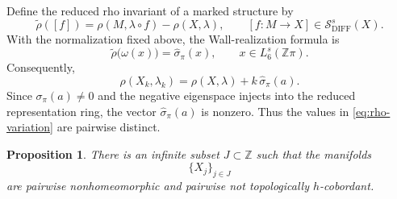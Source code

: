 \documentclass[10pt,reqno]{amsart}
\numberwithin{equation}{section}
\newtheorem{proposition}{Proposition}
\theoremstyle{definition}
\theoremstyle{remark}
\newcommand{\Z}{\mathbb Z}
\newcommand{\DIFF}{\mathrm{DIFF}}
\newcommand{\cS}{\mathcal S}
\newcommand{\rhot}{\widetilde{\rho}}
\begin{document}
Define the reduced rho invariant of a marked structure by
\[
\rhot([f])
=
\rho(M,\lambda\circ f)-\rho(X,\lambda),
\qquad
[f\colon M\to X]\in\cS^s_{\DIFF}(X).
\]
With the normalization fixed above, the Wall-realization
formula is
\begin{equation}\label{eq:rho-wall-realization}
\rhot\bigl(\omega(x)\bigr)
=
\widehat\sigma_\pi(x),
\qquad
x\in L_6^s(\Z\pi).
\end{equation}
Consequently,
\begin{equation}\label{eq:rho-variation}
\rho(X_k,\lambda_k)
=
\rho(X,\lambda)
+
k\,\widehat\sigma_\pi(a).
\end{equation}
Since \(\sigma_\pi(a)\neq0\) and the negative eigenspace injects into
the reduced representation ring, the vector
\(\widehat\sigma_\pi(a)\) is nonzero.  Thus the values in
\eqref{eq:rho-variation} are pairwise distinct.

\begin{proposition}\label{prop:nonhomeomorphic-spheres}
There is an infinite subset \(J\subset\Z\) such that the manifolds
\[
\{X_j\}_{j\in J}
\]
are pairwise nonhomeomorphic and pairwise not topologically
\(h\)-cobordant.
\end{proposition}
\end{document}
